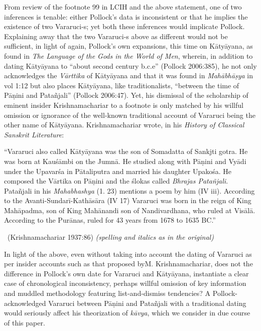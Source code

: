 From review of the footnote 99 in LCIH and the above statement, one of two inferences is tenable: either Pollock’s data is inconsistent or that he implies the existence of two Vararuci-s; yet both these inferences would implicate Pollock. Explaining away that the two Vararuci-s above as different would not be sufficient, in light of again, Pollock’s own expansions, this time on Kātyāyana, as found in \textit{The Language of the Gods in the World of Men}, wherein, in addition to dating Kātyāyana to “about second century b.c.e” (Pollock 2006:385), he not only acknowledges the \textit{Vārttika} of Kātyāyana and that it was found in \textit{Mahābhāṣya} in vol 1:12 but also places Kātyāyana, like traditionalists, “between the time of Pāṇini and Patañjali” (Pollock 2006:47). Yet, his dismissal of the scholarship of eminent insider Krishnamachariar to a footnote is only matched by his willful omission or ignorance of the well-known traditional account of Vararuci being the other name of Kātyāyana. Krishnamachariar wrote, in his \textit{History of Classical Sanskrit Literature}:

\begin{myquote}
“Vararuci also called Kātyāyana was the son of Somadatta of Sankjti gotra. He was born at Kauśāmbi on the Jumnā. He studied along with Pāṇini and Vyādi under the Upavarśa in Pātaliputra and married his daughter Upakośa. He composed the Vārtika on Pāṇini and the ślokas called \textit{Bhrajas Patañjali}. Patañjali in his \textit{Mahabhashya} (1. 23) mentions a poem by him (IV iii). According to the Avanti-Sundarī-Kathāsāra (IV 17) Vararuci was born in the reign of King Mahāpadma, son of King Mahānandi son of Nandivardhana, who ruled at Visālā. According to the Purānas, ruled for 43 years from 1678 to 1635 BC.” 

~\hfill (Krishnamachariar 1937:86) \textit{(spelling and italics as in the original)}
\end{myquote}

In light of the above, even without taking into account the dating of Vararuci as per insider accounts such as that proposed by\break M. Krishnamachariar, does not the difference in Pollock’s own date for Vararuci and Kātyāyana, instantiate a clear case of chronological inconsistency, perhaps willful omission of key information and muddled methodology featuring list-and-dismiss tendencies? A Pollock-acknowledged Vararuci between Pāṇini and Patañjali with a traditional dating would seriously affect his theorization of \textit{kāvya}, which we consider in due course of this paper.


